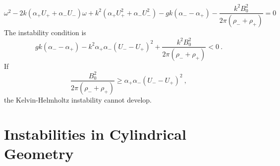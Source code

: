 \documentclass[12pt,a4paper]{article}
\begin{document}
\begin{equation}
\omega^2 -2k(\alpha_+ U_+ +\alpha_- U_-) \omega +k^2 (\alpha_+ U^2_+ + \alpha_- U^2_-) - gk(\alpha_- -\alpha_+) -\dfrac{k^2 B_0^2}{2\pi(\rho_- +\rho_+)}= 0
\end{equation}
The instability condition is
\begin{equation*}
gk(\alpha_- -\alpha_+) -k^2 \alpha_+ \alpha_-(U_- -U_+)^2 +\dfrac{k^2 B_0^2}{2\pi(\rho_- +\rho_+)} < 0 ~.
\end{equation*}
If
\begin{equation*}
\dfrac{B_0^2}{2\pi(\rho_- +\rho_+)} \geqslant \alpha_+ \alpha_-(U_- -U_+)^2 ~,
\end{equation*}
the Kelvin-Helmholtz instability cannot develop.













































































\section{Instabilities in Cylindrical Geometry}
\end{document}
